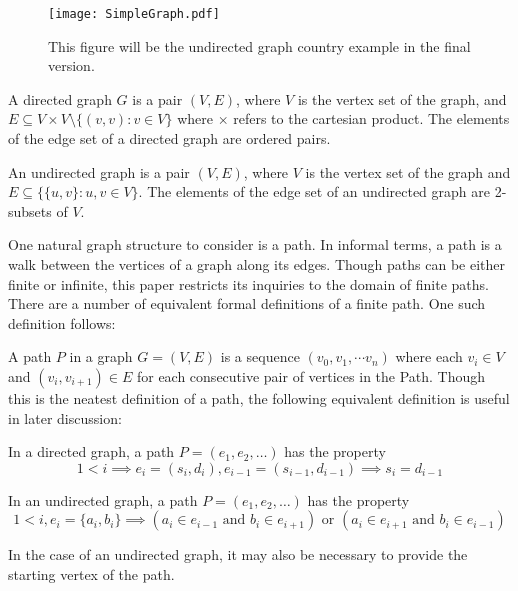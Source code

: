 \documentclass[12pt,twoside]{reedthesis}
\begin{document}
\begin{figure}[h!]
\begin{center}
\texttt{[image: SimpleGraph.pdf]}
\end{center}
\caption{This figure will be the undirected graph country example in the final version.}
\end{figure}


A directed graph $G$ is a pair $(V,E)$, where $V$ is the vertex set of the graph,  and $E \subseteq V \times V \setminus \{(v,v) : v \in V\}$ where $\times$ refers to the cartesian product. The elements of the edge set of a directed graph are ordered pairs.

An undirected graph is a pair $(V,E)$, where $V$ is the vertex set of the graph and $E \subseteq \{ \{u,v\} : u,v \in V \}$. The elements of the edge set of an undirected graph are 2-subsets of $V$.


One natural graph structure to consider is a path. In informal terms, a path is a walk between the vertices of a graph along its edges. Though paths can be either finite or infinite, this paper restricts its inquiries to the domain of finite paths. There are a number of equivalent formal definitions of a finite path. One such definition follows:

A path $P$ in a graph $G = (V,E)$ is a sequence $(v_0, v_1, \cdots v_n)$ where each $v_i \in V$ and $(v_i, v_{i+1}) \in E$ for each consecutive pair of vertices in the Path.  Though this is the neatest definition of a path, the following equivalent definition is useful in later discussion:

In a directed graph, a path $P = (e_1, e_2, \ldots)$ has the property
 $$1 < i \implies e_i = (s_i, d_i), e_{i-1} = (s_{i-1}, d_{i-1}) \implies s_i = d_{i-1}$$

In an undirected graph, a  path $P = (e_1, e_2, \ldots)$ has the property
$$
1 < i, e_i = \{a_i, b_i\} \implies (a_i \in e_{i-1} \mbox{ and } b_i \in e_{i+1} ) \mbox{ or } 
(a_i \in e_{i+1} \mbox{ and } b_i \in e_{i-1} )
$$

In the case of an undirected graph, it may also be necessary to provide the starting vertex of the path.
\end{document}
